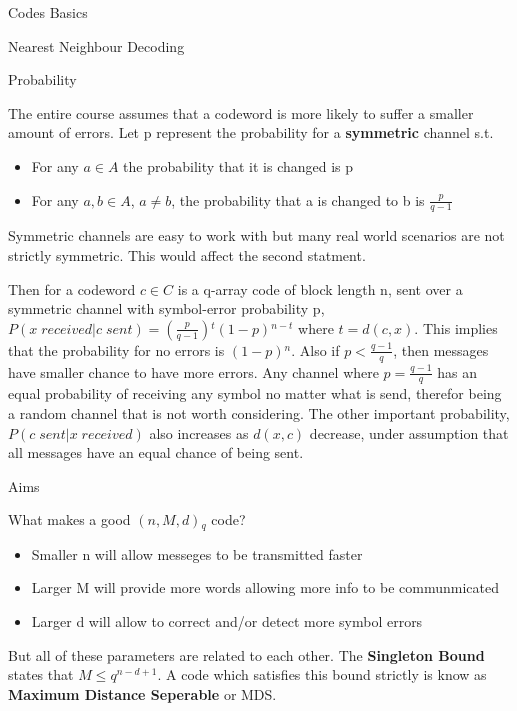 \documentclass[12pt, letterpaper]{article}
\begin{document}
\begin{section}{Codes Basics}
\begin{subsection}{Nearest Neighbour Decoding}
  \end{subsection}

  \begin{subsection}{Probability}

    The entire course assumes that a codeword is more likely to suffer a
    smaller amount of errors. Let p represent the probability for a
    \textbf{symmetric} channel s.t.\
    \begin{itemize}
      \item For any \(a \in A\) the probability that it is changed is p
      \item For any \(a, b \in A\), \(a \neq b\), the probability that a is
            changed to b is \(\frac{p}{q - 1}\)
    \end{itemize}

    Symmetric channels are easy to work with but many real world scenarios are
    not strictly symmetric. This would affect the second statment.

    Then for a codeword \(c \in C\) is a q-array code of block length n, sent
    over a symmetric channel with symbol-error probability p, \\ \(P(x \;
    received |  c \; sent) = (\frac{p}{q - 1}){}^{t} (1 - p){}^{n - t}\) where
    \(t = d(c, x)\). This implies that the probability for no errors is
    \((1 - p){}^{n}\). Also if \(p < \frac{q - 1}{q}\), then messages have
    smaller chance to have more errors. Any channel where \(p =
    \frac{q - 1}{q}\) has an equal probability of receiving any symbol no
    matter what is send, therefor being a random channel that is not worth
    considering. The other important probability, \(P(c \; sent
    | x \; received)\) also increases as \(d(x, c)\) decrease, under
    assumption that all messages have an equal chance of being sent.

  \end{subsection}

  \begin{subsection}{Aims}

    What makes a good \((n, M, d){}_{q}\) code?
    \begin{itemize}
      \item Smaller n will allow messeges to be transmitted faster
      \item Larger M will provide more words allowing more info to be
            communmicated
      \item Larger d will allow to correct and/or detect more symbol errors
    \end{itemize}
    But all of these parameters are related to each other. The
    \textbf{Singleton Bound} states that \(M \leq q^{n - d + 1}\). A code
    which satisfies this bound strictly is know as \textbf{Maximum Distance
      Seperable} or MDS.


\end{subsection}
\end{section}
\end{document}
